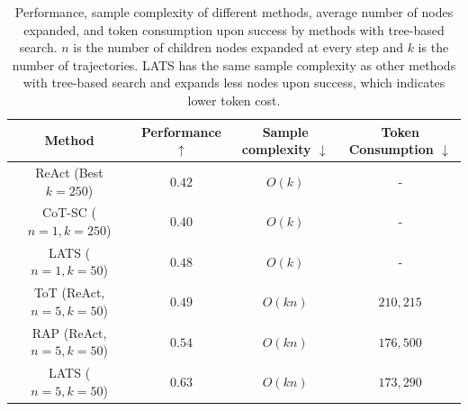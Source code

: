 \begin{table}[t]
    \small
    \centering
    \begin{tabular}{c|c|c|c}
        \toprule
        Method & Performance $\uparrow$ & Sample complexity $\downarrow$ & Token Consumption $\downarrow$ \\
        \hline
         ReAct (Best $k=250$) & $0.42$ & $O(k)$ & - \\
         CoT-SC ($n=1, k=250$) & $0.40$ & $O(k)$ & -  \\
         LATS ($n=1, k=50$) & $0.48$ & $O(k)$ & -  \\
         ToT (ReAct, $n=5,k=50$) & $0.49$ & $O(kn)$ & $210,215$\\
         RAP (ReAct, $n=5,k=50$) & $0.54$ & $O(kn)$ & $176,500$\\
         LATS ($n=5,k=50$) & $0.63$ & $O(kn)$ & $173,290$\\
         \bottomrule
    \end{tabular}
    \caption{Performance, sample complexity of different methods, average number of nodes expanded, and token consumption upon success by methods with tree-based search. $n$ is the number of children nodes expanded at every step and $k$ is the number of trajectories. LATS has the same sample complexity as other methods with tree-based search and expands less nodes upon success, which indicates lower token cost.}
    \label{tab:cost}
\end{table}